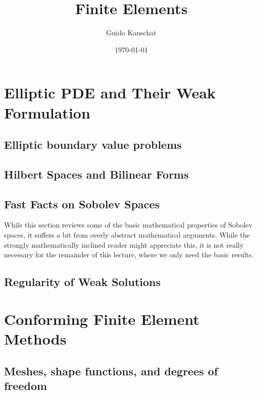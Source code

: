 \usepackage[notref,notcite]{showkeys}
\usepackage{tikz}
\usetikzlibrary{svg.path}


\def\constref#1{C_{\text{\ref{#1}}}}
\title{Finite Elements}
\author{Guido Kanschat}
\date{\today}

\def\vecx{\mathbf x}

\maketitle
\tableofcontents
\chapter{Elliptic PDE and Their Weak Formulation}
\section{Elliptic boundary value problems}


\section{Hilbert Spaces and Bilinear Forms}


\section{Fast Facts on Sobolev Spaces}

\begin{intro}
  While this section reviews some of the basic mathematical properties
  of Sobolev spaces, it suffers a bit from overly abstract
  mathematical arguments. While the strongly mathematically inclined
  reader might appreciate this, it is not really necessary for the
  remainder of this lecture, where we only need the basic results.
\end{intro}


\section{Regularity of Weak Solutions}


\chapter{Conforming Finite Element Methods}
\section{Meshes, shape functions, and degrees of freedom}

